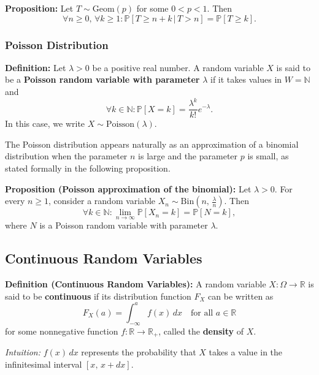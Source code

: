 \documentclass[a4paper]{extarticle}
\begin{document}
\begin{cbox}
    \textbf{Proposition:} Let \(T \sim \text{Geom}(p)\) for some \(0 < p < 1\). Then
    \[
        \forall n \geq 0, \, \forall k \geq 1 : \mathbb{P}[T \geq n + k \, | \, T > n] = \mathbb{P}[T \geq k].
    \]
\end{cbox}

\subsubsection{Poisson Distribution}

\textbf{Definition:} Let \(\lambda > 0\) be a positive real number. A random variable \(X\) is said to be a \textbf{Poisson random variable with parameter} \(\lambda\) if it takes values in \(W = \mathbb{N}\) and
\[
    \forall k \in \mathbb{N} : \mathbb{P}[X = k] = \frac{\lambda^k}{k!}e^{- \lambda}.
\]
In this case, we write \(X \sim \text{Poisson}(\lambda)\).

The Poisson distribution appears naturally as an approximation of a binomial distribution when the parameter \(n\) is large and the parameter \(p\) is small, as stated formally in the following proposition.

\begin{cbox}
    \textbf{Proposition (Poisson approximation of the binomial):} Let \(\lambda > 0\). For every \(n \geq 1\), consider a random variable \(X_n \sim \text{Bin}(n, \, \frac{\lambda}{n})\). Then
    \[
        \forall k \in \mathbb{N} : \lim_{n \to \infty} \mathbb{P}[X_n = k] = \mathbb{P}[N = k],
    \]
    where \(N\) is a Poisson random variable with parameter \(\lambda\).
\end{cbox}

\subsection{Continuous Random Variables}

\textbf{Definition (Continuous Random Variables):} A random variable \(X : \Omega \to \mathbb{R}\) is said to be \textbf{continuous} if its distribution function \(F_X\) can be written as
\[
    F_X(a) = \int_{- \infty}^a f(x) \, dx \quad \text{for all } a \in \mathbb{R}
\]
for some nonnegative function \(f : \mathbb{R} \to \mathbb{R}_+\), called the \textbf{density} of \(X\).

\textit{Intuition:} \(f(x) \, dx\) represents the probability that \(X\) takes a value in the infinitesimal interval \([x, \, x + dx]\).
\end{document}
